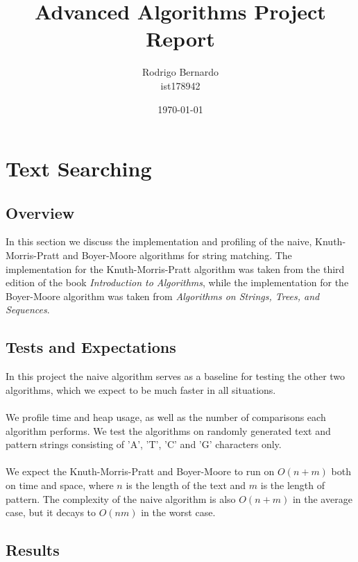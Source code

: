 \documentclass[12pt, a4paper]{article}
\title{\textbf{Advanced Algorithms Project Report}}
\author{Rodrigo Bernardo \\ ist178942}
\affil{Instituto Superior Técnico}
\date{\today}
\begin{document}
\maketitle

\section{Text Searching}
\subsection{Overview}
In this section we discuss the implementation and profiling of the naive,
Knuth-Morris-Pratt and Boyer-Moore algorithms for string matching. The
implementation for the Knuth-Morris-Pratt algorithm was taken from the
third edition of the book \textit{Introduction to Algorithms}, while the
implementation for the Boyer-Moore algorithm was taken from \textit{Algorithms
on Strings, Trees, and Sequences}.

\subsection{Tests and Expectations}
In this project the naive algorithm serves as a baseline for testing the other
two algorithms, which we expect to be much faster in all situations.
\paragraph{}
We profile time and heap usage, as well as the number of comparisons each
algorithm performs. We test the algorithms on randomly generated text and
pattern strings consisting of 'A', 'T', 'C' and 'G' characters only.
\paragraph{}
We expect the Knuth-Morris-Pratt and Boyer-Moore to run on $O(n+m)$ both on time
and space, where $n$ is the length of the text and $m$ is the length of pattern.
The complexity of the naive algorithm is also $O(n+m)$ in the average case, but
it decays to $O(nm)$ in the worst case.

\subsection{Results}
\end{document}

